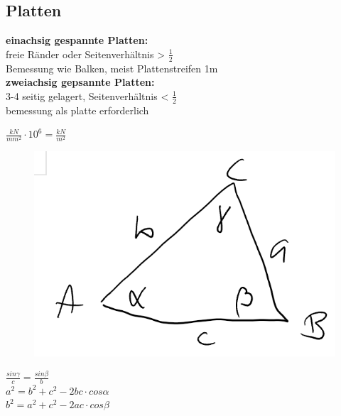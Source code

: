 	\begin{minipage}{0.5\linewidth}
		
		\subsection{Platten}
			
			\textbf{einachsig gespannte Platten:} \\
				freie Ränder oder Seitenverhältnis > $ \frac{1}{2} $ \\
				Bemessung wie Balken, meist Plattenstreifen 1m \\
				
			\textbf{zweiachsig gepsannte Platten:}	\\
				3-4 seitig gelagert, Seitenverhältnis < $ \frac{1}{2} $ \\
				bemessung als platte erforderlich \\
			
			
	\end{minipage}
\begin{minipage}{0.5\linewidth}
	
	 $ \frac{kN}{mm^2} \cdot 10^6 = \frac{kN}{m^2} $ 
	
	\begin{figure}
		\includegraphics[width=\linewidth]{images/Dreieck.PNG}
	\end{figure}
	
	$ \frac{sin \gamma}{c} = \frac{sin \beta}{b} $ \\
	$ a^2 = b^2 + c^2 - 2bc \cdot cos \alpha $ \\
	$ b^2 = a^2 + c^2 - 2ac \cdot cos \beta $
	
\end{minipage}

